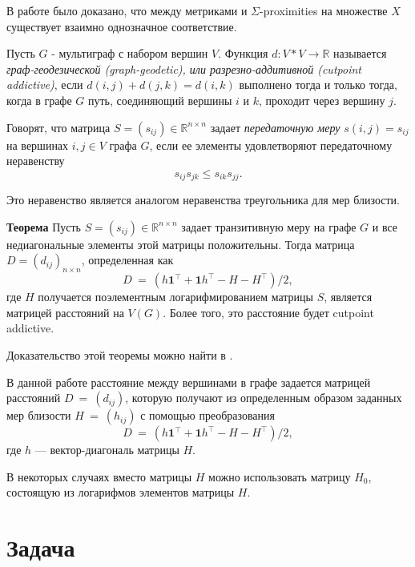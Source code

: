 В работе \cite{chebotarev2013studying} было доказано, что между метриками и $\Sigma$-proximities на множестве $X$ существует взаимно однозначное соответствие.

\begin{definition}
Пусть $G$ - мультиграф с набором вершин $V$. Функция $d: V*V \rightarrow \mathbb{R}$ называется \emph{граф-геодезической (graph-geodetic), или разрезно-аддитивной (cutpoint addictive)}, если $d(i,j)+d(j,k) = d(i,k)$ выполнено тогда и только тогда, когда в графе $G$ путь, соединяющий вершины $i$ и $k$, проходит через вершину $j$.
\end{definition}

\begin{definition}
Говорят, что матрица $S=(s_{ij}) \in \mathbb{R}^{n\times n}$ задает \emph{передаточную меру} $s(i,j) = s_{ij}$ на вершинах $i,j \in V$ графа $G$, если ее элементы удовлетворяют передаточному неравенству $$s_{ij}s_{jk} \le s_{ik}s_{jj}.$$

Это неравенство является аналогом неравенства треугольника для мер близости.
\end{definition}

\textbf{Теорема}
Пусть $S=(s_{ij}) \in \mathbb{R}^{n\times n}$ задает транзитивную меру на графе $G$ и все недиагональные элементы этой матрицы положительны. Тогда матрица $D = (d_{ij})_{n\times n}$, определенная как
$$D~=~(h \textbf{1}^\intercal + \textbf{1} h^\intercal - H - H ^\intercal) /2,$$ 
где $H$ получается поэлементным логарифмированием матрицы $S$, является матрицей расстояний на $V(G)$. Более того, это расстояние будет cutpoint addictive.

Доказательство этой теоремы можно найти в \cite{chebotarev2005duality}.


В данной работе расстояние между вершинами в графе задается матрицей расстояний $D~=~(d_{ij})$, которую получают из определенным образом заданных мер близости $H~=~(h_{ij})$ с помощью преобразования
$$D~=~(h \textbf{1}^\intercal + \textbf{1} h^\intercal - H - H ^\intercal) /2, $$
где $h$ --- вектор-диагональ матрицы $H$.

В некоторых случаях вместо матрицы $H$ можно использовать матрицу $H_0$, состоящую из логарифмов элементов матрицы $H$.


\clearpage

\section{Задача} \label{sect1_2}

